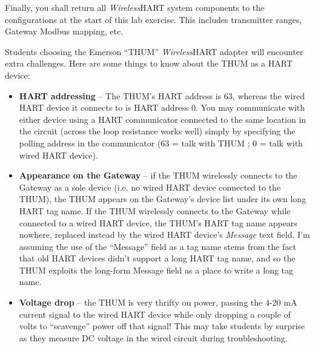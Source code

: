 \vskip 10pt

Finally, you shall return all {\sl Wireless}HART system components to the configurations at the start of this lab exercise.  This includes transmitter ranges, Gateway Modbus mapping, etc.















Students choosing the Emerson ``THUM'' {\sl Wireless}HART adapter will encounter extra challenges.  Here are some things to know about the THUM as a HART device:

\begin{itemize}
\item{} {\bf HART addressing} -- The THUM's HART address is 63, whereas the wired HART device it connects to is HART address 0.  You may communicate with either device using a HART communicator connected to the same location in the circuit (across the loop resistance works well) simply by specifying the polling address in the communicator (63 = talk with THUM ; 0 = talk with wired HART device).
\vskip 10pt
\item{} {\bf Appearance on the Gateway} -- if the THUM wirelessly connects to the Gateway as a sole device (i.e. no wired HART device connected to the THUM), the THUM appears on the Gateway's device list under its own long HART tag name.  If the THUM wirelessly connects to the Gateway while connected to a wired HART device, the THUM's HART tag name appears nowhere, replaced instead by the wired HART device's {\it Message} text field.  I'm assuming the use of the ``Message'' field as a tag name stems from the fact that old HART devices didn't support a long HART tag name, and so the THUM exploits the long-form Message field as a place to write a long tag name.
\vskip 10pt
\item{} {\bf Voltage drop} -- the THUM is very thrifty on power, passing the 4-20 mA current signal to the wired HART device while only dropping a couple of volts to ``scavenge'' power off that signal!  This may take students by surprise as they measure DC voltage in the wired circuit during troubleshooting.
\end{itemize}














